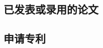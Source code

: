 % 

\begin{tableofpublications}
  \subsection*{已发表或录用的论文}
  \begin{enumerate}[{[}1{]}]
  \item {}
  \item {}
  \end{enumerate}

  \subsection*{申请专利}
  \begin{enumerate}[{[}1{]}]
  \item {}
  \end{enumerate}
\end{tableofpublications}




